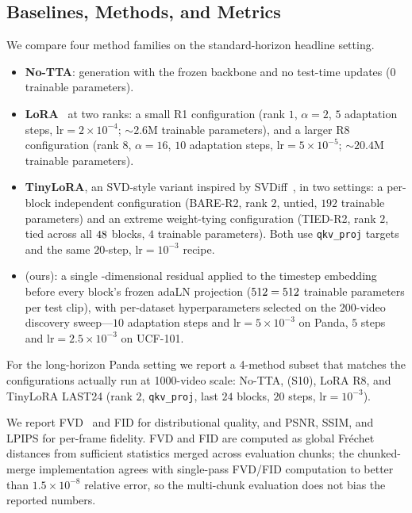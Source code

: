 \subsection{Baselines, Methods, and Metrics}
\label{sec:exp_baselines}

We compare four method families on the standard-horizon headline setting.

\begin{itemize}
  \item \textbf{No-TTA}: generation with the frozen \backbone backbone and
        no test-time updates ($0$ trainable parameters).
  \item \textbf{LoRA}~\citep{hu2022lora} at two ranks: a small \textsf{R1}
        configuration (rank $1$, $\alpha=2$, $5$ adaptation steps,
        $\mathrm{lr}=2\!\times\!10^{-4}$; ${\sim}2.6\mathrm{M}$ trainable
        parameters), and a larger \textsf{R8} configuration (rank $8$,
        $\alpha=16$, $10$ adaptation steps, $\mathrm{lr}=5\!\times\!10^{-5}$;
        ${\sim}20.4\mathrm{M}$ trainable parameters).
  \item \textbf{TinyLoRA}, an SVD-style variant inspired by
        SVDiff~\citep{han2023svdiff}, in two settings: a per-block
        independent configuration (\textsf{BARE-R2}, rank $2$, untied,
        $192$ trainable parameters) and an extreme weight-tying
        configuration (\textsf{TIED-R2}, rank $2$, tied across all
        $48$ blocks, $4$ trainable parameters). Both use
        \texttt{qkv\_proj} targets and the same $20$-step, $\mathrm{lr}=10^{-3}$
        recipe.
  \item \textbf{\method} (ours): a single \dimt-dimensional residual
        applied to the timestep embedding before every block's frozen adaLN
        projection ($512 = 512$ trainable parameters per test clip), with
        per-dataset hyperparameters selected on the 200-video discovery
        sweep---$10$ adaptation steps and $\mathrm{lr}=5\!\times\!10^{-3}$
        on Panda, $5$ steps and $\mathrm{lr}=2.5\!\times\!10^{-3}$ on
        UCF-101.
\end{itemize}

For the long-horizon Panda setting we report a 4-method subset that
matches the configurations actually run at 1000-video scale: No-TTA,
\method (\textsf{S10}), LoRA \textsf{R8}, and TinyLoRA \textsf{LAST24}
(rank $2$, \texttt{qkv\_proj}, last $24$ blocks, $20$ steps,
$\mathrm{lr}=10^{-3}$).

We report FVD~\citep{unterthiner2018fvd} and FID for distributional
quality, and PSNR, SSIM, and LPIPS for per-frame fidelity. FVD and FID are
computed as global Fr\'echet distances from sufficient statistics merged
across evaluation chunks; the chunked-merge implementation agrees with
single-pass FVD/FID computation to better than $1.5\!\times\!10^{-8}$
relative error, so the multi-chunk evaluation does not bias the reported
numbers.

